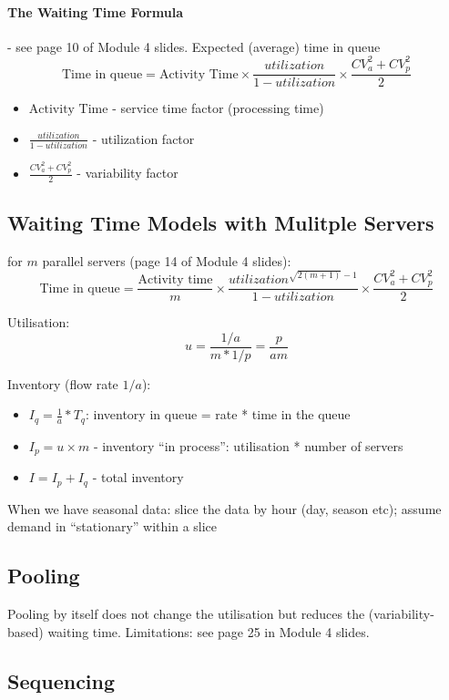 \documentclass{scrartcl}
\begin{document}
\paragraph{The Waiting Time Formula}

- see page 10 of Module 4 slides. Expected (average) time in queue
$$\mbox{Time in queue} = \mbox{Activity Time} \times \frac{utilization}{1-utilization} \times \frac{CV_a^2 + CV_p^2}2 $$
\begin{itemize}
\item $\mbox{Activity Time}$ - service time factor (processing time)
\item $\frac{utilization}{1-utilization}$ - utilization factor
\item $\frac{CV_a^2 + CV_p^2}2$ - variability factor
\end{itemize}

\subsection{Waiting Time Models with Mulitple Servers}
\label{sec:06-03}

for $m$ parallel servers (page 14 of Module 4 slides):
$$\mbox{Time in queue} = \frac{\mbox{Activity time}}m \times \frac{utilization ^{\sqrt{2(m+1)} - 1}}{1 -utilization} \times \frac{CV_a^2 + CV_p^2}2$$

Utilisation:
$$ u = \frac{1/a}{m * 1/p} = \frac{p}{am}$$

Inventory (flow rate $1/a$):
\begin{itemize}
\item $I_q = \frac1a * T_q$: inventory in queue =  rate * time in the queue
\item $I_p = u \times m$ - inventory ``in process'': utilisation * number of servers
\item $I = I_p + I_q$ - total inventory
\end{itemize}

When we have seasonal data: slice the data by hour (day, season etc); assume demand in ``stationary'' within a slice

\subsection{Pooling}
\label{sec:06-04}

Pooling by itself does not change the utilisation but reduces the (variability-based) waiting time. Limitations: see page 25 in Module 4 slides.

\subsection{Sequencing}
\label{sec:06-05}
\end{document}
